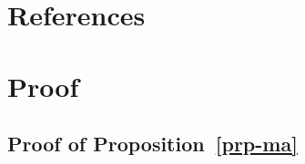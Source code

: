 \documentclass[
  11pt,
  a4paper,
]{article}
\theoremstyle{plain}
\theoremstyle{remark}
\begin{document}
\section*{References}\label{references}

\printbibliography[heading=none]

\newpage
\appendix
\setcounter{section}{0}
\renewcommand{\thesection}{Appendix \Alph{section}}
\renewcommand{\thesubsection}{\Alph{section}.\arabic{subsection}}
\renewcommand{\thefigure}{A\arabic{figure}}
\renewcommand{\thetable}{A\arabic{table}}
\setcounter{figure}{0}
\setcounter{table}{0}

\section{Proof}\label{sec-proof}

\subsection{\texorpdfstring{Proof of
Proposition~\ref{prp-ma}}{Proof of Proposition~}}\label{sec-proof_ma}
\end{document}
